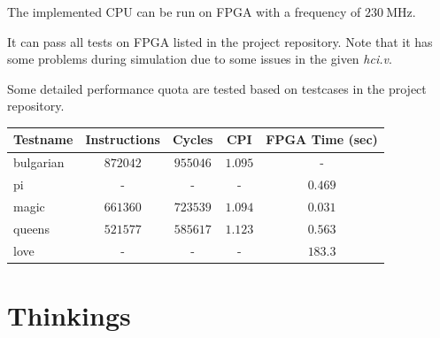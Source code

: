\documentclass{article}
\begin{document}
            The implemented CPU can be run on FPGA with a frequency of $230~\mathrm{MHz}$.

            It can pass all tests on FPGA listed in the project repository.
            Note that it has some problems during simulation due to some issues in the given \textit{hci.v}.

            Some detailed performance quota are tested based on testcases in the project repository.

    \clearpage

            \begin{table}[h]
            \centering
            \begin{tabular}{l c c c c}
                \toprule
                Testname & Instructions & Cycles & CPI & FPGA Time (sec)\\
                \midrule
                bulgarian & $872042$ & $955046$ & $1.095$ & - \\
                pi & - & - & - & $0.469$ \\
                magic & $661360$ & $723539$ & $1.094$ & $0.031$ \\
                queens & $521577$ & $585617$ & $1.123$ & $0.563$ \\
                love & - & - & - & $183.3$\\
                \bottomrule
            \end{tabular}
            \end{table}

    \section{Thinkings}
\end{document}
